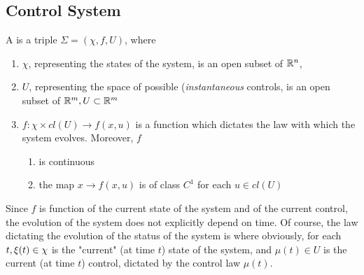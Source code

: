 \subsection{Control System} A  is a triple $\Sigma=(\chi,f,U) $, where 
\begin{enumerate}
	\item $\chi$, representing the states of the system, is an open subset of $\mathbb{R}^n$,
	\item $U$, representing the space of possible (\textit{instantaneous} controls, is an open subset of $\mathbb{R}^m,U\subset\mathbb{R}^m$
	\item $f: \chi \times cl(U) \rightarrow f(x,u)$ is a function which dictates the law with which the system evolves. Moreover, $f$
	\begin{enumerate}
		\item is continuous
		\item the map $x \rightarrow f(x,u)$ is of class $C^1$ for each $u \in cl(U)$
	\end{enumerate}
\end{enumerate}

Since $f$ is function of the current state of the system and of the current control, the evolution of the system does not explicitly depend on time. Of course, the law dictating the evolution of the status of the system is 
where obviously, for each $t,\xi (t)\in\chi$ is the "current" (at time $t$) state of the system, and $\mu(t)\in U$ is the current (at time $t$) control, dictated by the control law $\mu(t)$.



